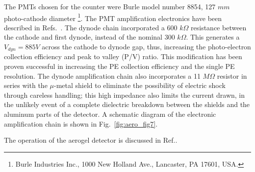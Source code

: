 {The PMTs chosen for the counter were Burle model number 8854, 127 $mm$ photo-cathode 
diameter
\footnote{Burle Industries Inc., 1000 New Holland Ave., Lancaster, PA 17601, USA.}.
  The PMT amplification electronics have been described in 
Refs.~\cite{Alexa:1995ne,Lolos:1997vz}.  The dynode chain incorporated a
600 $k\Omega$ resistance between the cathode and first dynode, instead of the
nominal 300 $k\Omega$.  This generates a $V_{dyn}=885 V$ across the cathode to
dynode gap, thus, increasing the photo-electron collection efficiency and peak
to valley (P/V) ratio.  This modification has been proven successful in
increasing the PE collection efficiency and the single PE resolution.  The
dynode amplification chain also incorporates a 11 $M\Omega$ resistor in series
with the $\mu$-metal shield to eliminate the possibility of electric shock
through careless handling; this high impedance also limits the current drawn,
in the unlikely event of a complete dielectric breakdown between the shields
and the aluminum parts of the detector. A schematic diagram of the electronic 
amplification chain is shown in Fig.~\ref{fig:aero_fig7}. 

The operation of the aerogel detector is discussed in Ref.\cite{Brash:2002vn}.



}
